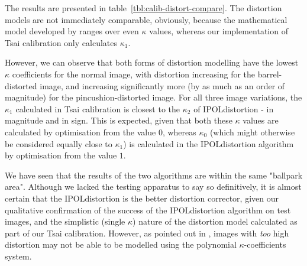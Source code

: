 The results are presented in table~\ref{tbl:calib-distort-compare}. The distortion models are not immediately comparable, obviously, because the mathematical model developed by \cite{algebraic-distortion} ranges over even $\kappa$ values, whereas our implementation of Tsai calibration only calculates $\kappa_{1}$.

However, we can observe that both forms of distortion modelling have the lowest $\kappa$ coefficients for the normal image, with distortion increasing for the barrel-distorted image, and increasing significantly more (by as much as an order of magnitude) for the pincushion-distorted image. For all three image variations, the $\kappa_{1}$ calculated in Tsai calibration is closest to the $\kappa_{2}$ of IPOLdistortion - in magnitude and in sign. This is expected, given that both these $\kappa$ values are calculated by optimisation from the value $0$, whereas $\kappa_{0}$ (which might otherwise be considered equally close to $\kappa_{1}$) is calculated in the IPOLdistortion algorithm by optimisation from the value $1$.

We have seen that the results of the two algorithms are within the same "ballpark area". Although we lacked the testing apparatus to say so definitively, it is almost certain that the IPOLdistortion is the better distortion corrector, given our qualitative confirmation of the success of the IPOLdistortion algorithm on test images, and the simplistic (single $\kappa$) nature of the distortion model calculated as part of our Tsai calibration. However, as pointed out in \cite{straightlines}, images with \emph{too} high distortion may not be able to be modelled using the polynomial $\kappa$-coefficients system.
